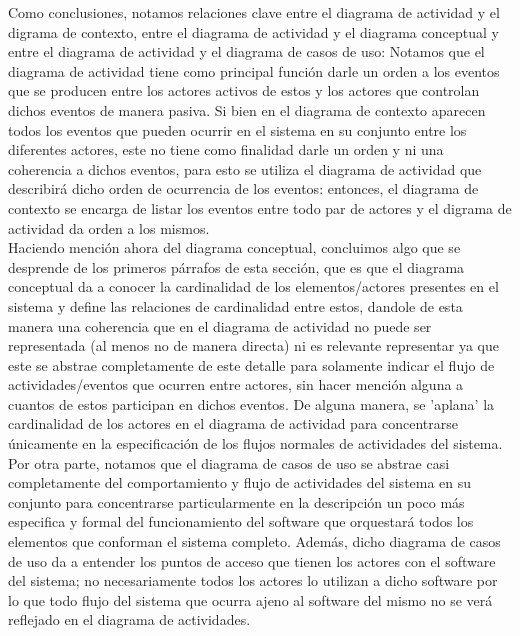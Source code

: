 \documentclass[spanish, 10pt,a4paper]{article}
\numberwithin{equation}{section} %
\begin{document}
Como conclusiones, notamos relaciones clave entre el diagrama de actividad y el digrama de contexto, entre el diagrama de actividad y el diagrama conceptual y entre el diagrama de actividad y el diagrama de casos de uso: Notamos que el diagrama de actividad tiene como principal funci\'on darle un orden a los eventos que se producen entre los actores activos de estos y los actores que controlan dichos eventos de manera pasiva. Si bien en el diagrama de contexto aparecen todos los eventos que pueden ocurrir en el sistema en su conjunto entre los diferentes actores, este no tiene como finalidad darle un orden y ni una coherencia a dichos eventos, para esto se utiliza el diagrama de actividad que describir\'a dicho orden de ocurrencia de los eventos: entonces, el diagrama de contexto se encarga de listar los eventos entre todo par de actores y el digrama de actividad da orden a los mismos.\\
Haciendo menci\'on ahora del diagrama conceptual, concluimos algo que se desprende  de los primeros p\'arrafos de esta secci\'on, que es que el diagrama conceptual da a conocer la cardinalidad de los elementos/actores presentes en el sistema y define las relaciones de cardinalidad entre estos, dandole de esta manera una coherencia que en el diagrama de actividad no puede ser representada (al menos no de manera directa) ni es relevante representar ya que este se abstrae completamente de este detalle para solamente indicar el flujo de actividades/eventos que ocurren entre actores, sin hacer menci\'on alguna a cuantos de estos participan en dichos eventos. De alguna manera, se 'aplana' la cardinalidad de los actores en el diagrama de actividad para concentrarse \'unicamente en la especificaci\'on de los flujos normales de actividades del sistema.\\
Por otra parte, notamos que el diagrama de casos de uso se abstrae casi completamente del comportamiento y flujo de actividades del sistema en su conjunto para concentrarse particularmente en la descripci\'on un poco m\'as especifica y formal del funcionamiento del software que orquestar\'a todos los elementos que conforman el sistema completo. Adem\'as, dicho diagrama de casos de uso da a entender los puntos de acceso que tienen los actores con el software del sistema; no necesariamente todos los actores lo utilizan a dicho software por lo que todo flujo del sistema que ocurra ajeno al software del mismo no se ver\'a reflejado en el diagrama de actividades.\\
\end{document}
